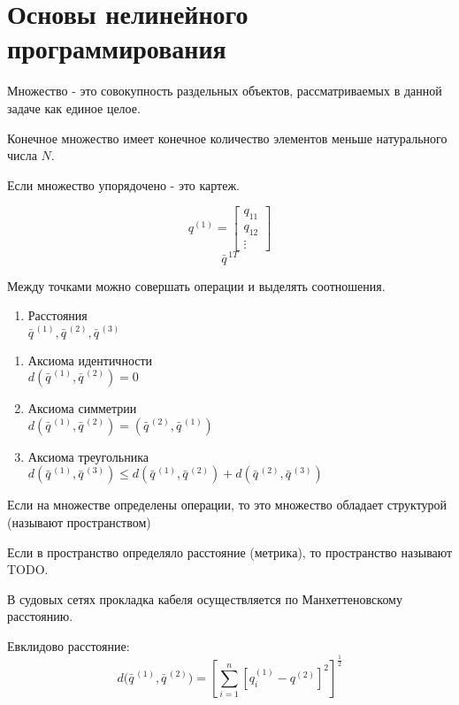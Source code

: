 \documentclass[12pt,a5paper]{scrbook}
\begin{document}
  \chapter{Основы нелинейного программирования}
  Множество - это совокупность раздельных объектов, рассматриваемых в данной задаче как единое целое.
  \par
  Конечное множество имеет конечное количество элементов меньше натурального числа $N$.
  \par
  Если множество упорядочено - это картеж.
  \par
  $$
    q^{(1)} =
    \begin{bmatrix}
      q_{11}\\
      q_{12}\\
      \vdots
    \end{bmatrix}
  $$
  $$\bar{q}^{\,1T}$$
  \par
  Между точками можно совершать операции и выделять соотношения.
  \begin{enumerate}
    \item Расстояния\\$\bar{q}^{\,(1)}, \bar{q}^{\,(2)}, \bar{q}^{\,(3)}$
  \end{enumerate}
  \begin{enumerate}
    \item Аксиома идентичности\\$d(\bar{q}^{\,(1)}, \bar{q}^{\,(2)}) = 0$
    \item Аксиома симметрии\\$d(\bar{q}^{\,(1)}, \bar{q}^{\,(2)}) = (\bar{q}^{\,(2)}, \bar{q}^{\,(1)})$
    \item Аксиома треугольника\\$d(\bar{q}^{\,(1)}, \bar{q}^{\,(3)})\leq d(\bar{q}^{\,(1)}, \bar{q}^{\,(2)}) + d(\bar{q}^{\,(2)}, \bar{q}^{\,(3)})$
  \end{enumerate}
  \par
  Если на множестве определены операции, то это множество обладает структурой (называют пространством)
  \par
  Если в пространство определяло расстояние (метрика), то пространство называют TODO.
  \par
  В судовых сетях прокладка кабеля осуществляется по Манхеттеновскому расстоянию.
  \par
  Евклидово расстояние:
  $$
    d
      \Big(
        \bar{q}^{\,\left(1\right)}, \bar{q}^{\,\left(2\right)}
      \Big)
      =
      \left[
        \sum_{i = 1}^{n}
        \left[
          q^{(1)}_{i} - q^{(2)}
        \right]^2
      \right]^{\frac{1}{2}}
  $$
\end{document}
